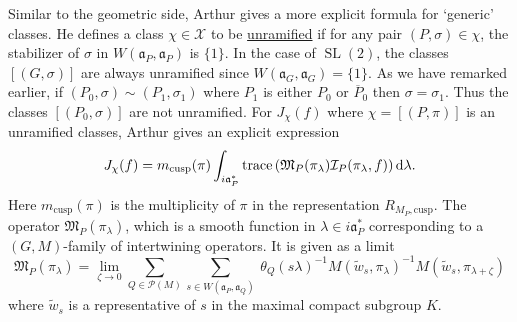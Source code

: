 \documentclass[11pt]{amsart}
\def\III{\mathcal I}
\def\MMM{\mathfrak M}	%
\def\PPP{\mathcal P}
\def\XXX{\mathcal X}
\def\aaa{\mathfrak a}
\def\cb#1{{\color{black}#1}}
\def\d{\text d}
\def\cusp{\text{cusp}}
\def\oP{\overline{P}}
\def\sl{\operatorname{SL}}
\def\trace{\operatorname{trace}}
\theoremstyle{remark}
\begin{document}
Similar to the geometric side, Arthur gives a more explicit formula for `generic' classes. He defines a class $\chi \in \XXX$ to be \underline{unramified} if for any pair $(P, \sigma) \in \chi$, the stabilizer of $\sigma$ in $W(\aaa_P, \aaa_P)$ is $\{1\}$. \cb{In the case of $\sl(2)$, the classes $[(G, \sigma)]$ are always unramified since $W(\aaa_G, \aaa_G) = \{1\}$. As we have remarked earlier, if $(P_0, \sigma) \sim (P_1, \sigma_1)$ where $P_1$ is either $P_0$ or $\oP_0$ then $\sigma = \sigma_1$. Thus the classes $[(P_0, \sigma)]$ are not unramified. 
}
For $J_\chi(f)$ where $\chi = [(P, \pi)]$ is an unramified classes, Arthur gives an explicit expression
\[ J_\chi(f) = m_{\cusp}(\pi) \int_{i\aaa_P^*} \trace\left(\MMM_P(\pi_\lambda) \III_P(\pi_\lambda, f)\right) \d \lambda. \]
Here $m_{\cusp}(\pi)$ is the multiplicity of $\pi$ in the representation $R_{M_P, \cusp}$. The operator $\MMM_P(\pi_\lambda)$, which is a smooth function in $\lambda \in i\aaa_P^*$ corresponding to a $(G, M)$-family of intertwining operators. It is given as a limit
\[ \MMM_P(\pi_\lambda) = \lim_{\zeta \to 0} \sum_{Q \in \PPP(M)} \sum_{s \in W(\aaa_P, \aaa_Q)} \
		\theta_Q(s\lambda)^{-1} M(\tilde w_s, \pi_\lambda)^{-1} M(\tilde w_s, \pi_{\lambda + \zeta}) \]
where $\tilde w_s$ is a representative of $s$ in the maximal compact subgroup $K$. 
\end{document}

